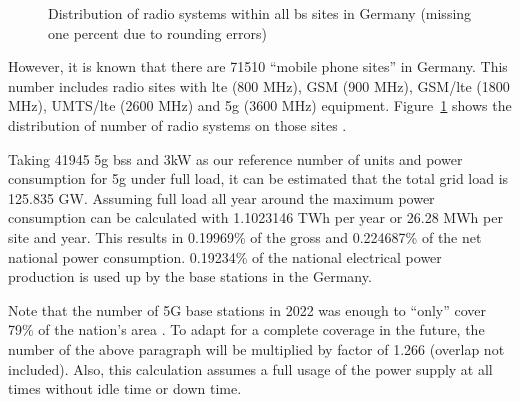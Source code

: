 \documentclass[11pt,a4paper]{article}
\begin{document}
\begin{figure}[h]
  \centering
  \caption{Distribution of radio systems within all \acrlong*{bs} sites in Germany \citep{EMF} (missing one percent due to rounding errors)}
  \label{fig:EMFdistribution}
\end{figure}

However, it is known that there are 71510 \enquote{mobile phone sites} in Germany.
This number includes radio sites with \acrshort{lte} (800 MHz), GSM (900 MHz), GSM/\acrshort{lte} (1800 MHz), UMTS/\acrshort{lte} (2600 MHz) and \acrshort{5g} (3600 MHz) equipment.
Figure~\ref{fig:EMFdistribution} shows the distribution of number of radio systems on those sites \citep{EMF}.

Taking 41945 \acrshort{5g} \acrlong{bs}s and 3kW as our reference number of units and power consumption for \acrshort{5g} under full load, it can be estimated that the total grid load is 125.835 GW.
Assuming full load all year around the maximum power consumption can be calculated with 1.1023146 TWh per year or 26.28 MWh per site and year.
This results in 0.19969\% of the gross and 0.224687\% of the net national power consumption.
0.19234\% of the national electrical power production is used up by the base stations in the Germany.

Note that the number of 5G base stations in 2022 was enough to \enquote{only} cover 79\% of the nation's area \citep{5Gausbau}.
To adapt for a complete coverage in the future, the number of the above paragraph will be multiplied by factor of 1.266 (overlap not included).
Also, this calculation assumes a full usage of the power supply at all times without idle time or down time.
\end{document}
